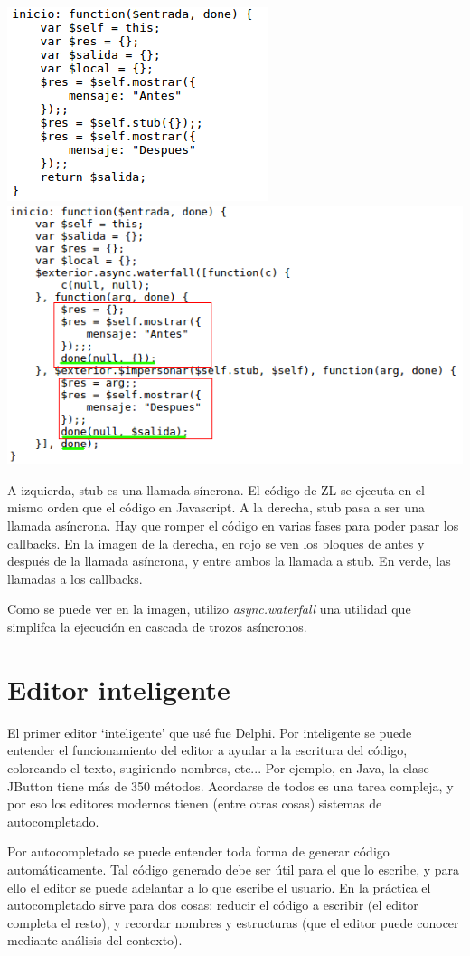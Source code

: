 \documentclass{report}
\begin{document}
	\begin{center}
	\includegraphics[width=0.45\linewidth]{asincrono3}
	\includegraphics[width=0.45\linewidth]{asincrono2}
	
	A izquierda, stub es una llamada síncrona. El código de ZL se ejecuta en el mismo orden que el código en Javascript. A la derecha, stub pasa a ser una llamada asíncrona. Hay que romper el código en varias fases para poder pasar los callbacks. En la imagen de la derecha, en rojo se ven los bloques de antes y después de la llamada asíncrona, y entre ambos la llamada a stub. En verde, las llamadas a los callbacks.
	\end{center}

	 Como se puede ver en la imagen, utilizo \textit{async.waterfall} una utilidad\cite{async} que simplifca la ejecución en cascada de trozos asíncronos.
	
	\section{Editor inteligente}
	
	El primer editor `inteligente' que usé fue Delphi. Por inteligente se puede entender el funcionamiento del editor a ayudar a la escritura del código, coloreando el texto, sugiriendo nombres, etc... Por ejemplo, en Java, la clase JButton tiene más de 350 métodos. Acordarse de todos es una tarea compleja, y por eso los editores modernos tienen (entre otras cosas) sistemas de autocompletado. 
	
	\vspace{10px}
	
	Por autocompletado se puede entender toda forma de generar código automáticamente. Tal código generado debe ser útil para el que lo escribe, y para ello el editor se puede adelantar a lo que escribe el usuario. En la práctica el autocompletado sirve para dos cosas: reducir el código a escribir (el editor completa el resto), y recordar nombres y estructuras (que el editor puede conocer mediante análisis del contexto).
	
\end{document}
